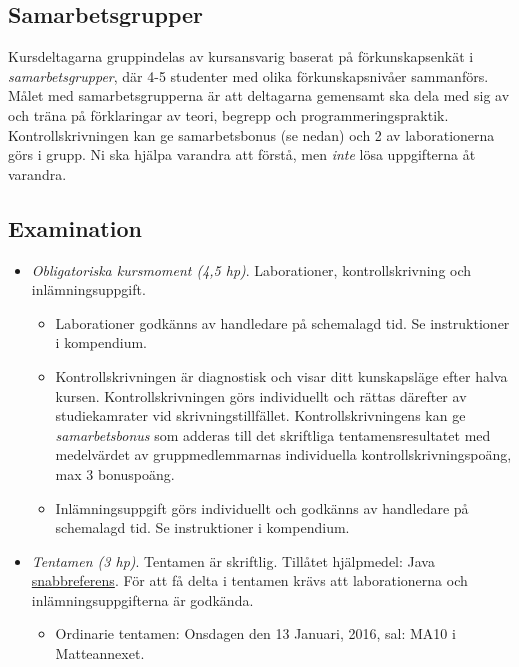 \subsection{Samarbetsgrupper}\label{samarbetsgrupper}

Kursdeltagarna gruppindelas av kursansvarig baserat på förkunskapsenkät
i \emph{samarbetsgrupper}, där 4-5 studenter med olika förkunskapsnivåer
sammanförs. Målet med samarbetsgrupperna är att deltagarna gemensamt ska
dela med sig av och träna på förklaringar av teori, begrepp och
programmeringspraktik. Kontrollskrivningen kan ge samarbetsbonus (se
nedan) och 2 av laborationerna görs i grupp. Ni ska hjälpa varandra att
förstå, men \emph{inte} lösa uppgifterna åt varandra.

\subsection{Examination}\label{examination}

\begin{itemize}
\item
  \emph{Obligatoriska kursmoment (4,5 hp)}. Laborationer,
  kontrollskrivning och inlämningsuppgift.

  \begin{itemize}
  \item
    Laborationer godkänns av handledare på schemalagd tid. Se
    instruktioner i kompendium.
  \item
    Kontrollskrivningen är diagnostisk och visar ditt kunskapsläge efter
    halva kursen. Kontrollskrivningen görs individuellt och rättas
    därefter av studiekamrater vid skrivningstillfället.
    Kontrollskrivningens kan ge \emph{samarbetsbonus} som adderas till
    det skriftliga tentamensresultatet med medelvärdet av
    gruppmedlemmarnas individuella kontrollskrivningspoäng, max 3
    bonuspoäng.
  \item
    Inlämningsuppgift görs individuellt och godkänns av handledare på
    schemalagd tid. Se instruktioner i kompendium.
  \end{itemize}
\item
  \emph{Tentamen (3 hp)}. Tentamen är skriftlig. Tillåtet hjälpmedel:
  Java \href{http://cs.lth.se/eda016/javaref}{snabbreferens}. För att få
  delta i tentamen krävs att laborationerna och inlämningsuppgifterna är
  godkända.

  \begin{itemize}
  \itemsep1pt\parskip0pt
  \item
    Ordinarie tentamen: Onsdagen den 13 Januari, 2016, sal: MA10 i
    Matteannexet.
  \end{itemize}
\end{itemize}
